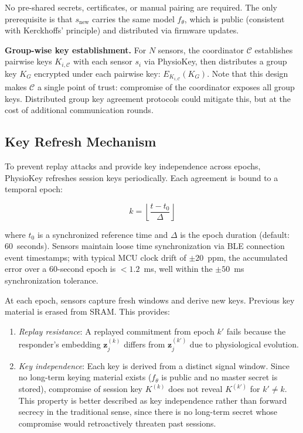 \documentclass[sensors,article,submit,pdftex,moreauthors]{Definitions/mdpi}
\begin{document}
No pre-shared secrets, certificates, or manual pairing are required. The only prerequisite is that $s_{\text{new}}$ carries the same model $f_\theta$, which is public (consistent with Kerckhoffs' principle) and distributed via firmware updates.

\textbf{Group-wise key establishment.} For $N$ sensors, the coordinator $\mathcal{C}$ establishes pairwise keys $K_{i,\mathcal{C}}$ with each sensor $s_i$ via PhysioKey, then distributes a group key $K_G$ encrypted under each pairwise key: $E_{K_{i,\mathcal{C}}}(K_G)$. Note that this design makes $\mathcal{C}$ a single point of trust: compromise of the coordinator exposes all group keys. Distributed group key agreement protocols could mitigate this, but at the cost of additional communication rounds.

\subsection{Key Refresh Mechanism}
\label{subsec:key_refresh}

To prevent replay attacks and provide key independence across epochs, PhysioKey refreshes session keys periodically. Each agreement is bound to a temporal epoch:

\begin{equation}
\label{eq:epoch}
k = \left\lfloor \frac{t - t_0}{\Delta} \right\rfloor
\end{equation}

where $t_0$ is a synchronized reference time and $\Delta$ is the epoch duration (default: 60~seconds). Sensors maintain loose time synchronization via BLE connection event timestamps; with typical MCU clock drift of $\pm 20$~ppm, the accumulated error over a 60-second epoch is $< 1.2$~ms, well within the $\pm 50$~ms synchronization tolerance.

At each epoch, sensors capture fresh windows and derive new keys. Previous key material is erased from SRAM. This provides:
\begin{enumerate}
    \item \textit{Replay resistance}: A replayed commitment from epoch $k'$ fails because the responder's embedding $\mathbf{z}_j^{(k)}$ differs from $\mathbf{z}_j^{(k')}$ due to physiological evolution.
    \item \textit{Key independence}: Each key is derived from a distinct signal window. Since no long-term keying material exists ($f_\theta$ is public and no master secret is stored), compromise of session key $K^{(k)}$ does not reveal $K^{(k')}$ for $k' \neq k$. This property is better described as key independence rather than forward secrecy in the traditional sense, since there is no long-term secret whose compromise would retroactively threaten past sessions.
\end{enumerate}
\end{document}
